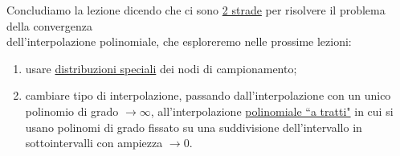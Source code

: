 \documentclass[12pt,headings=optiontohead]{article}
\begin{document}
Concludiamo la lezione dicendo che ci sono \uline{2 strade} per risolvere il problema della convergenza \\ dell'interpolazione polinomiale, che esploreremo nelle prossime lezioni:
\begin{enumerate}
    \item usare \uline{distribuzioni speciali} dei nodi di campionamento;
    \item cambiare tipo di interpolazione, passando dall'interpolazione con un unico polinomio di grado $\to \infty$, all'interpolazione \uline{polinomiale ``a tratti"} in cui si usano polinomi di grado fissato su una suddivisione dell'intervallo in sottointervalli con ampiezza $\to 0$.
\end{enumerate}
\end{document}
